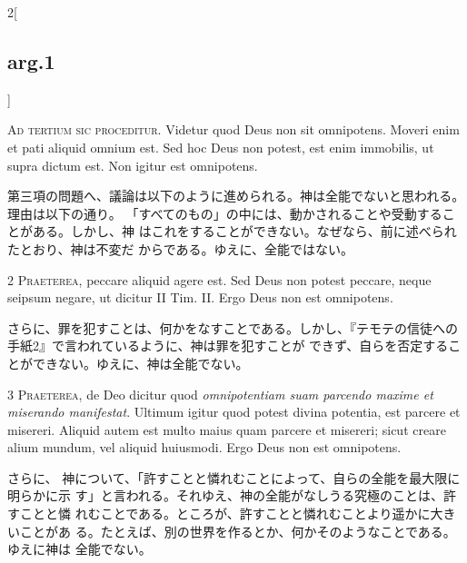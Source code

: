 \documentclass[paper=a4paper,fontsize=10pt,jafontsize=9pt,titlepage]{jlreq}
\begin{document}
\begin{paracol}{2}[\subsection{arg.1}]

{\Huge A}{\scshape d tertium sic proceditur}. Videtur quod
Deus non sit omnipotens. Moveri enim et pati aliquid omnium est. Sed hoc
Deus non potest, est enim immobilis, ut supra dictum est. Non igitur est
omnipotens.

\switchcolumn

第三項の問題へ、議論は以下のように進められる。神は全能でないと思われる。
 理由は以下の通り。
「すべてのもの」の中には、動かされることや受動することがある。しかし、神
 はこれをすることができない。なぜなら、前に述べられたとおり、神は不変だ
 からである。ゆえに、全能ではない。


{\scshape 2 Praeterea}, peccare aliquid agere est. Sed
Deus non potest peccare, neque seipsum negare, ut dicitur II
Tim. II. Ergo Deus non est omnipotens.

\switchcolumn

さらに、罪を犯すことは、何かをなすことである。しかし、『テモテの信徒への
 手紙2』で言われているように、神は罪を犯すことが
 できず、自らを否定することができない。ゆえに、神は全能でない。


{\scshape 3 Praeterea}, de Deo dicitur quod
{\itshape omnipotentiam suam parcendo maxime et miserando manifestat}. Ultimum
igitur quod potest divina potentia, est parcere et misereri. Aliquid
autem est multo maius quam parcere et misereri; sicut creare alium
mundum, vel aliquid huiusmodi. Ergo Deus non est omnipotens.

\switchcolumn

さらに、
神について、「許すことと憐れむことによって、自らの全能を最大限に明らかに示
 す」と言われる。それゆえ、神の全能がなしうる究極のことは、許すことと憐
 れむことである。ところが、許すことと憐れむことより遥かに大きいことがあ
 る。たとえば、別の世界を作るとか、何かそのようなことである。ゆえに神は
 全能でない。


\end{paracol}
\end{document}
